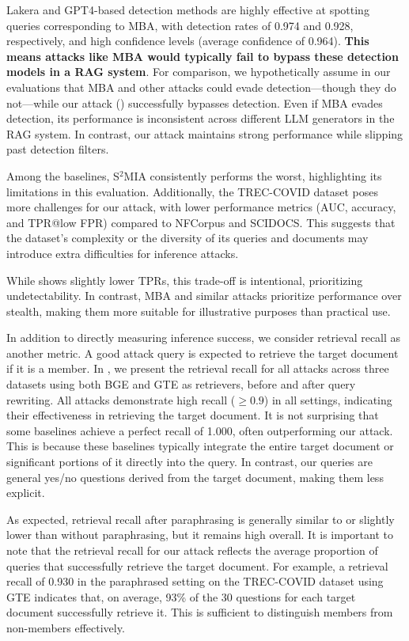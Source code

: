 

Lakera and GPT4-based detection methods are highly effective at spotting queries corresponding to MBA, with detection rates of 0.974 and 0.928, respectively, and high confidence levels (average confidence of 0.964). \textbf{This means attacks like MBA would typically fail to bypass these detection models in a RAG system}. For comparison, we hypothetically assume in our evaluations that MBA and other attacks could evade detection---though they do not---while our attack (\ourattack) successfully bypasses detection. Even if MBA evades detection, its performance is inconsistent across different LLM generators in the RAG system. In contrast, our attack maintains strong performance while slipping past detection filters.

Among the baselines, S$^{2}$MIA consistently performs the worst, highlighting its limitations in this evaluation. Additionally, the TREC-COVID dataset poses more challenges for our attack, with lower performance metrics (AUC, accuracy, and TPR@low FPR) compared to NFCorpus and SCIDOCS. This suggests that the dataset's complexity or the diversity of its queries and documents may introduce extra difficulties for inference attacks.

While \ourattack shows slightly lower TPRs, this trade-off is intentional, prioritizing undetectability. In contrast, MBA and similar attacks prioritize performance over stealth, making them more suitable for illustrative purposes than practical use.


\label{sec:retrieval_recall}
In addition to directly measuring inference success, we consider retrieval recall as another metric. A good attack query is expected to retrieve the target document if it is a member. In , we present the retrieval recall for all attacks across three datasets using both BGE and GTE as retrievers, before and after query rewriting. All attacks demonstrate high recall ($\geq 0.9$) in all settings, indicating their effectiveness in retrieving the target document. It is not surprising that some baselines achieve a perfect recall of 1.000, often outperforming our attack. This is because these baselines typically integrate the entire target document or significant portions of it directly into the query. In contrast, our queries are general yes/no questions derived from the target document, making them less explicit. 

As expected, retrieval recall after paraphrasing is generally similar to or slightly lower than without paraphrasing, but it remains high overall. It is important to note that the retrieval recall for our attack reflects the average proportion of queries that successfully retrieve the target document. For example, a retrieval recall of 0.930 in the paraphrased setting on the TREC-COVID dataset using GTE indicates that, on average, 93\% of the 30 questions for each target document successfully retrieve it. This is sufficient to distinguish members from non-members effectively.

